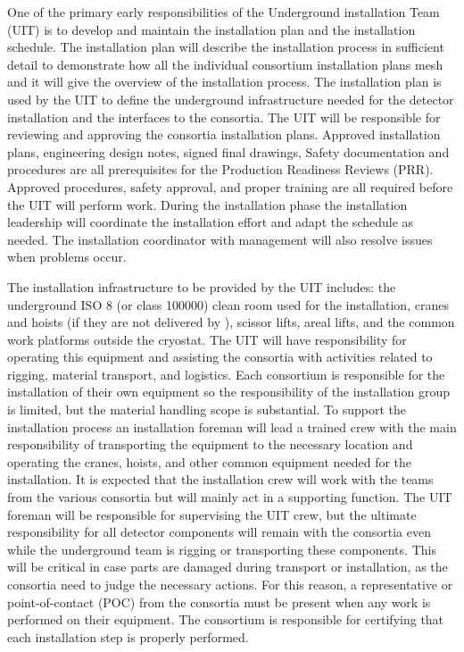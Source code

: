One of the primary early responsibilities of the Underground
installation Team (UIT) is to develop and maintain the 
installation plan and the installation schedule. The 
installation plan will describe the installation process in sufficient
detail to demonstrate how all the individual consortium installation
plans mesh and it will give the overview of the installation
process. The installation plan is used by the UIT to define the
underground infrastructure needed for the detector installation and
the interfaces to the consortia. The UIT will be responsible for
reviewing and approving the consortia installation plans. Approved
installation plans, engineering design notes, signed final drawings,
Safety documentation and procedures are all prerequisites for the
Production Readiness Reviews (PRR). Approved procedures, safety
approval, and proper training are all required before the UIT will
perform work. During the installation phase the installation
leadership will coordinate the  installation effort and
adapt the schedule as needed. The installation coordinator with
management will also resolve issues when problems occur.

The installation infrastructure to be provided by the UIT includes:
the underground ISO 8 (or class \num{100000}) clean room used for the
installation, cranes and hoists (if they are not delivered by
), scissor lifts, areal lifts, and the common work
platforms outside the cryostat. The UIT will have responsibility for
operating this equipment and assisting the consortia with activities
related to rigging, material transport, and logistics. Each consortium
is responsible for the installation of their own equipment so the
responsibility of the installation group is limited, but the material
handling scope is substantial. To support the installation process an
installation foreman will lead a trained crew with the main
responsibility of transporting the equipment to the necessary location
and operating the cranes, hoists, and other common equipment needed
for the installation. It is expected that the installation crew will
work with the teams from the various consortia but will mainly act in
a supporting function. The UIT foreman will be responsible for
supervising the UIT crew, but the ultimate responsibility for all
detector components will remain with the consortia even while the
underground team is rigging or transporting these components.  This
will be critical in case parts are damaged during transport or
installation, as the consortia need to judge the necessary
actions. For this reason, a representative or point-of-contact (POC)
from the consortia must be present when any work is performed on their
equipment. The consortium is responsible for certifying that each
installation step is properly performed.

